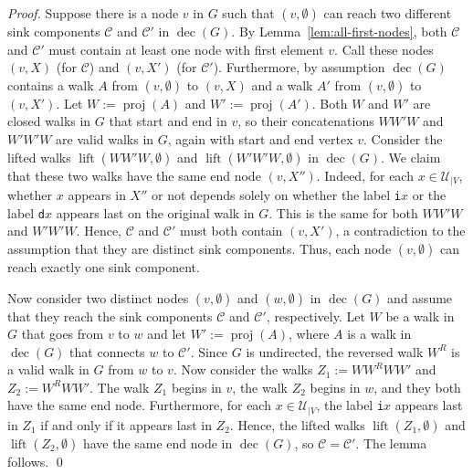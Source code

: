 \documentclass[oribibl,envcountsect,envcountsame]{llncs}
\DeclareMathOperator{\dec}{dec}
\DeclareMathOperator{\pj}{proj}
\DeclareMathOperator{\lt}{lift}
\newcommand{\C}{\mathcal C}
\newcommand{\U}{\mathcal U}
\newcommand{\eqdef}{:=}
\begin{document}
\begin{proof}
Suppose there is a node $v$ in $G$ such that  $(v, \emptyset)$ can reach two 
different sink components $\C$ and $\C'$ in $\dec(G)$. 
By Lemma~\ref{lem:all-first-nodes},
both $\C$ and $\C'$ must contain at least one node with first
element $v$. Call these nodes $(v,X)$ (for $\C$) and
$(v, X')$ (for $\C'$).
Furthermore, by assumption $\dec(G)$ contains a walk $A$ from 
$(v, \emptyset)$ to $(v,X)$ and a walk $A'$ from 
$(v, \emptyset)$ to $(v, X')$. 
Let $W \eqdef \pj(A)$ and $W' \eqdef \pj(A')$. Both $W$ and $W'$ are
closed walks in $G$ that start and end in $v$,
so their concatenations $WW'W$ and $W'W'W$ are
valid walks in $G$, again with start and end vertex $v$.
Consider the lifted walks 
$\lt(WW'W, \emptyset)$ and $\lt(W'W'W, \emptyset)$ in
$\dec(G)$. We claim that these two walks have the same end node $(v, X'')$. 
Indeed, for each $x \in \U_{|V}$, whether $x$ appears in $X''$ or not 
depends solely on whether the label \texttt{i}$x$ or the label \texttt{d}$x$
appears last on the original walk in $G$. This is the same
for both $WW'W$ and $W'W'W$. Hence,  $\C$ and $\C'$ must both contain
$(v, X')$, a contradiction to the assumption that they are distinct sink
components. 
Thus, each node $(v, \emptyset)$ can reach exactly one sink component. 

Now consider two distinct nodes $(v, \emptyset)$ and $(w, \emptyset)$
in $\dec(G)$ and assume that they reach the sink components $\C$ and $\C'$,
respectively. Let $W$ be a walk in $G$ that 
goes from  $v$ to $w$ and let $W' \eqdef \pj(A)$, where $A$ is 
a walk in $\dec(G)$ that 
connects $w$ to $\C'$. Since $G$ is undirected, the reversed walk
$W^R$ is a valid walk in $G$ from $w$ to $v$. 
Now consider the walks $Z_1 \eqdef WW^RWW'$ and $Z_2 \eqdef W^RWW'$. 
The walk $Z_1$ begins in
$v$, the  walk $Z_2$ begins in $w$, and they both have the same end node. 
Furthermore, for each $x \in \U_{|V}$, the label \texttt{i}$x$ appears last
in $Z_1$ if and only if it appears last in $Z_2$.
Hence, the lifted walks $\lt(Z_1, \emptyset)$ and $\lt(Z_2, \emptyset)$ 
have the  same end node in $\dec(G)$, so $\C = \C'$.  The lemma
follows.
\qed\end{proof}
\end{document}
